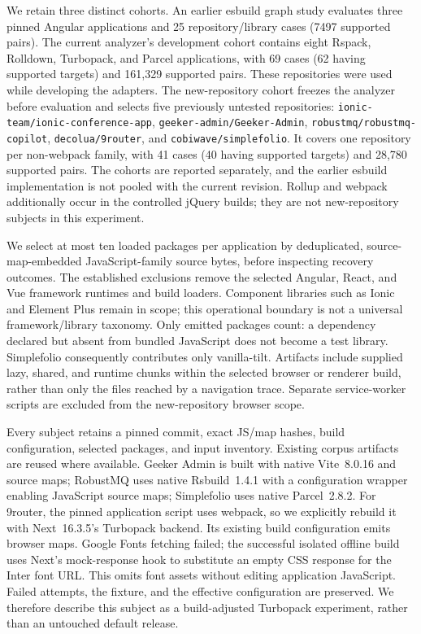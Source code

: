 

We retain three distinct cohorts. An earlier esbuild graph study evaluates three pinned Angular applications and 25 repository/library cases (7497 supported pairs). The current analyzer's development cohort contains eight Rspack, Rolldown, Turbopack, and Parcel applications, with 69 cases (62 having supported targets) and 161,329 supported pairs. These repositories were used while developing the adapters. The new-repository cohort freezes the analyzer before evaluation and selects five previously untested repositories: \nolinkurl{ionic-team/ionic-conference-app}, \nolinkurl{geeker-admin/Geeker-Admin}, \nolinkurl{robustmq/robustmq-copilot}, \nolinkurl{decolua/9router}, and \nolinkurl{cobiwave/simplefolio}. It covers one repository per non-webpack family, with 41 cases (40 having supported targets) and 28,780 supported pairs. The cohorts are reported separately, and the earlier esbuild implementation is not pooled with the current revision. Rollup and webpack additionally occur in the controlled jQuery builds; they are not new-repository subjects in this experiment.

We select at most ten loaded packages per application by deduplicated, source-map-embedded JavaScript-family source bytes, before inspecting recovery outcomes. The established exclusions remove the selected Angular, React, and Vue framework runtimes and build loaders. Component libraries such as Ionic and Element Plus remain in scope; this operational boundary is not a universal framework/library taxonomy. Only emitted packages count: a dependency declared but absent from bundled JavaScript does not become a test library. Simplefolio consequently contributes only vanilla-tilt. Artifacts include supplied lazy, shared, and runtime chunks within the selected browser or renderer build, rather than only the files reached by a navigation trace. Separate service-worker scripts are excluded from the new-repository browser scope.

Every subject retains a pinned commit, exact JS/map hashes, build configuration, selected packages, and input inventory. Existing corpus artifacts are reused where available. Geeker Admin is built with native Vite~8.0.16 and source maps; RobustMQ uses native Rsbuild~1.4.1 with a configuration wrapper enabling JavaScript source maps; Simplefolio uses native Parcel~2.8.2. For 9router, the pinned application script uses webpack, so we explicitly rebuild it with Next~16.3.5's Turbopack backend. Its existing build configuration emits browser maps. Google Fonts fetching failed; the successful isolated offline build uses Next's mock-response hook to substitute an empty CSS response for the Inter font URL. This omits font assets without editing application JavaScript. Failed attempts, the fixture, and the effective configuration are preserved. We therefore describe this subject as a build-adjusted Turbopack experiment, rather than an untouched default release.

